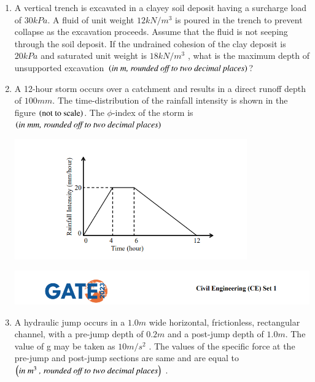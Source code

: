 \documentclass[journal,14pt,onecolumn]{IEEEtran}
\theoremstyle{remark}
\begin{document}
\begin{enumerate}[label={Q\arabic*.}]
\item A vertical trench is excavated in a clayey soil deposit having a surcharge load of $30 kPa$. A fluid of unit weight $12 kN/m^3$
is poured in the trench to prevent collapse as the excavation proceeds. Assume that the fluid is not seeping through the soil
deposit. If the undrained cohesion of the clay deposit is $20 kPa$ and saturated unit weight is $18 kN/m^3$ , what is the maximum depth of unsupported excavation $\left(\textit{in m,
rounded off to two decimal places}\right)$? \underline{\hspace{3cm}}
\vspace{1cm}

\item A 12-hour storm occurs over a catchment and results in a direct runoff depth of $100 mm$. The time-distribution of the rainfall intensity is shown in the figure $\left(\text{not to scale}\right)$. The $\phi$-index of the storm is $\left(\textit{in mm, rounded off to two decimal places}\right)$ \underline{\hspace{3cm}}

\includegraphics[width=10cm]{pics/Screenshot 2025-08-10 131131.png}

\newpage

\includegraphics[width=\textwidth]{pics/header.png}
\item A hydraulic jump occurs in a $1.0 m$ wide horizontal, frictionless, rectangular channel, with a pre-jump depth of $0.2 m$ and a post-jump depth of $1.0 m$. The value of g may be taken as $10 m/s^2$ . The values of the specific force at the pre-jump and post-jump sections are same and are equal to $\left(\textit{in $m^3$
, rounded off to two decimal places}\right)$ \underline{\hspace{3cm}}.
\vspace{1cm}


\end{enumerate}
\end{document}
